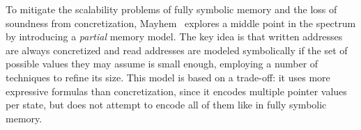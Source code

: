 
To mitigate the scalability problems of fully symbolic memory and the loss of soundness from concretization, {\sc Mayhem}~\cite{MAYHEM-SP12} explores a middle point in the spectrum by introducing a {\em partial} memory model. The key idea is that written addresses are always concretized and read addresses are modeled symbolically if the set of possible values they may assume is small enough, employing a number of techniques to refine its size. This model is based on a trade-off: it uses more expressive formulas than concretization, since it encodes multiple pointer values per state, but does not attempt to encode all of them like in fully symbolic memory.%

